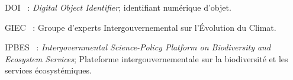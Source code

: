 
\resume
\begin{singlespace}


\end{singlespace}
\cleardoublepage


\abstract
\begin{singlespace}



\end{singlespace}
\cleardoublepage





\tabledesmatieres




\listedestableaux


\listedesfigures


\listeabrev
\begin{liste}

\item[DOI]~: \textit{Digital Object Identifier}; identifiant numérique d'objet.

\item[GIEC]~: Groupe d'experts Intergouvernemental sur l'Évolution du Climat.

\item[IPBES]~: \textit{Intergovernmental Science-Policy Platform on Biodiversity and Ecosystem Services}; Plateforme intergouvernementale sur la biodiversité et les services écosystémiques.

\end{liste}



